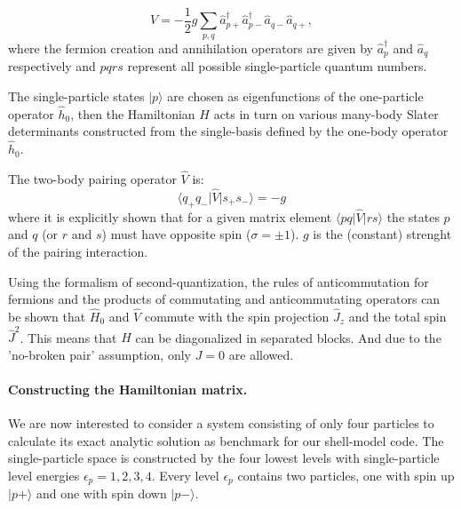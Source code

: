 \documentclass[twoside]{article}
\begin{document}
\begin{equation}
\hat V = -\frac{1}{2} g \sum_{p,q} \hat a_{p+}^\dagger \hat a_{p-}^\dagger \hat a_{q-} \hat a_{q+} ,\label{eq:V}
\end{equation}
where the fermion creation and annihilation operators are given by $\hat a_{p}^\dagger$ and $\hat a_{q}$ respectively and $pqrs$ represent all possible single-particle quantum numbers.

The single-particle states $\vert p \rangle$ are chosen as eigenfunctions of the one-particle operator $\hat{h}_0$, then the Hamiltonian $H$ acts in turn on various many-body Slater determinants constructed from the single-basis defined by the one-body operator $\hat{h}_0$.

The two-body pairing operator $\hat{V}$ is:
\begin{equation}
\langle q_+ q_- \vert \hat{V} \vert s_+s_- \rangle = -g
\end{equation}
where it is explicitly shown that for a given matrix element $\langle pq \vert \hat{V} \vert rs \rangle$ the states $p$ and $q$ (or $r$ and $s$) must have opposite spin ($\sigma=\pm 1$). $g$ is the (constant) strenght of the pairing interaction.

Using the formalism of second-quantization, the rules of anticommutation for fermions and the products of commutating and anticommutating operators can be shown that $\hat{H}_0$ and $\hat{V}$ commute with the spin projection $\hat{J}_z$ and the total spin $\hat{J}^2$. This means that $H$ can be diagonalized in separated blocks. And due to the 'no-broken pair' assumption, only $J = 0$ are allowed.


\paragraph{Constructing the Hamiltonian matrix.}

We are now interested to consider a system consisting of only four particles to calculate its exact analytic solution as benchmark for our shell-model code. The single-particle space is constructed by the four lowest levels with single-particle level energies $\epsilon_p = 1, 2, 3, 4$. Every level $\epsilon_p$ contains two particles, one with spin up $\vert p+ \rangle$ and one with spin down $\vert p- \rangle$. 
\end{document}
